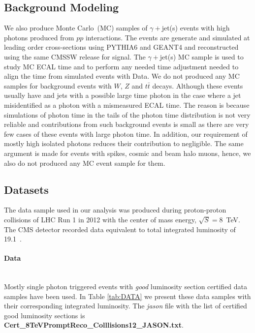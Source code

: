 \subsection{Background Modeling}
We also produce  Monte Carlo~(MC) samples of $\gamma +$jet(s) events with high \pt photons produced from  $pp$ interactions. The events are generate and simulated at leading order cross-sections using \textsf{PYTHIA6} and \textsf{GEANT4} and reconstructed using the same CMSSW release for signal.
The $\gamma +$jet(s) MC sample is used to study MC ECAL time and to perform any needed time adjustment needed to align the time from simulated events with Data. 
\newline
We do not produced any MC samples for background events with $W$, $Z$ and $t\bar{t}$ decays. Although these events usually have \MET and jets with a  possible large time photon in the case where a jet misidentified as a photon with a mismeasured ECAL time. The reason is because simulations of photon time in the tails of the photon time distribution is not very reliable and contributions from such background events is small as there are very few cases of these events with large photon time. In addition, our requirement of mostly high \pt isolated photons reduces their contribution to negligible. The same argument is made for events with spikes, cosmic and beam halo muons, hence, we also do not produced any MC event sample for them.
\subsection{Datasets}
The data sample used in our analysis was produced during proton-proton collisions of LHC Run 1 in 2012 with the center of mass energy, $\sqrt{S} = 8$~TeV. The CMS detector recorded data equivalent to total integrated luminosity of 19.1~\fbinv .
\paragraph*{Data}\mbox{}\\
Mostly single photon triggered events with \textit{good} luminosity section certified data samples have been used. In Table \ref{tab:DATA} we present these data samples with their corresponding integrated luminosity. The \textit{jason} file with the list of certified good luminosity sections is
 \textbf{Cert\_8TeVPromptReco\_Colllisions12\_JASON.txt}.
